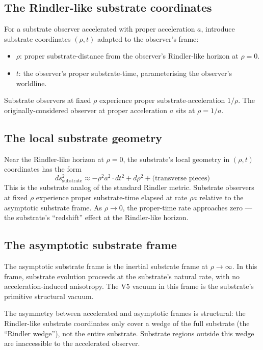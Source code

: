 \documentclass[11pt,a4paper]{article}
\begin{document}
\subsection{The Rindler-like substrate coordinates}

For a substrate observer accelerated with proper acceleration $a$, introduce substrate coordinates $(\rho, t)$ adapted to the observer's frame:

\begin{itemize}[noitemsep]
\item $\rho$: proper substrate-distance from the observer's Rindler-like horizon at $\rho = 0$.
\item $t$: the observer's proper substrate-time, parameterising the observer's worldline.
\end{itemize}

Substrate observers at fixed $\rho$ experience proper substrate-acceleration $1/\rho$. The originally-considered observer at proper acceleration $a$ sits at $\rho = 1/a$.

\subsection{The local substrate geometry}

Near the Rindler-like horizon at $\rho = 0$, the substrate's local geometry in $(\rho, t)$ coordinates has the form
\[
ds^{2}_{\mathrm{substrate}} \approx -\rho^{2} a^{2} \cdot dt^{2} + d\rho^{2} + \text{(transverse pieces)}
\]
This is the substrate analog of the standard Rindler metric. Substrate observers at fixed $\rho$ experience proper substrate-time elapsed at rate $\rho a$ relative to the asymptotic substrate frame. As $\rho \to 0$, the proper-time rate approaches zero --- the substrate's ``redshift'' effect at the Rindler-like horizon.

\subsection{The asymptotic substrate frame}

The asymptotic substrate frame is the inertial substrate frame at $\rho \to \infty$. In this frame, substrate evolution proceeds at the substrate's natural rate, with no acceleration-induced anisotropy. The V5 vacuum in this frame is the substrate's primitive structural vacuum.

The asymmetry between accelerated and asymptotic frames is structural: the Rindler-like substrate coordinates only cover a wedge of the full substrate (the ``Rindler wedge''), not the entire substrate. Substrate regions outside this wedge are inaccessible to the accelerated observer.
\end{document}
